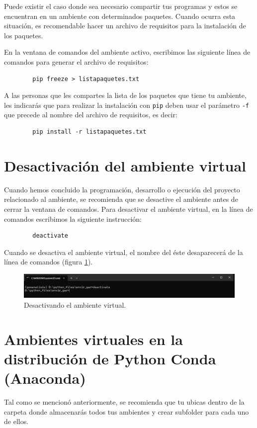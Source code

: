 \documentclass{article}
\begin{document}
	Puede existir el caso donde sea necesario compartir tus programas y estos se encuentran en un ambiente con determinados paquetes. Cuando ocurra esta situación, es recomendable hacer un archivo de requisitos para la instalación de los paquetes. \bigskip
	
	En la ventana de comandos del ambiente activo, escribimos las siguiente línea de comandos para generar el archivo de requisitos:
	\begin{verbatim}
		pip freeze > listapaquetes.txt
	\end{verbatim}
	
	A las personas que les compartes la lista de los paquetes que tiene tu ambiente, les indicarás que para realizar la instalación con \texttt{pip} deben usar el parámetro \texttt{-f} que precede al nombre del archivo de requisitos, es decir:
	\begin{verbatim}
		pip install -r listapaquetes.txt
	\end{verbatim}
	
	\section{Desactivación del ambiente virtual}
	Cuando hemos concluido la programación, desarrollo o ejecución del proyecto relacionado al ambiente, se recomienda que se desactive el ambiente antes de cerrar la ventana de comandos. Para desactivar el ambiente virtual, en la línea de comandos escribimos la siguiente instrucción:
	\begin{verbatim}
		deactivate
	\end{verbatim}
	
	Cuando se desactiva el ambiente virtual, el nombre del éste desaparecerá de la línea de comandos (figura \ref{fig:figura12}).
	
	\begin{figure}[H]
		\centering
		\includegraphics[width=0.9\linewidth]{Figura12}
		\caption{Desactivando el ambiente virtual.}
		\label{fig:figura12}
	\end{figure}
	
	\section{Ambientes virtuales en la distribución de Python Conda (Anaconda)}
	Tal como se mencionó anteriormente, se recomienda que tu ubicas dentro de la carpeta donde almacenarás todos tus ambientes y crear subfolder para cada uno de ellos.\bigskip
	
\end{document}
